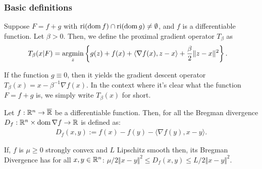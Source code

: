 \documentclass[12pt]{article}
\begin{document}
        \subsubsection{Basic definitions}
            \begin{definition}\label{def:pg-opt}
                Suppose $F = f + g$ with $\operatorname{ri}(\operatorname{dom} f) \cap \operatorname{ri}(\operatorname{dom} g) \neq \emptyset$, and $f$ is a differentiable function. 
                Let $\beta > 0$. 
                Then, we define the proximal gradient operator $T_{\beta}$ as 
                \begin{align*}
                    T_\beta (x | F) &= \mathop{\rm argmin}\limits_{z} \left\lbrace
                        g(z) + f(x) + \langle \nabla f(x), z - x\rangle + \frac{\beta}{2}\Vert z - x\Vert^2
                    \right\rbrace. 
                \end{align*}
            \end{definition}
            \begin{remark}
                If the function $g \equiv 0$, then it yields the gradient descent operator $T_\beta(x) = x - \beta^{-1}\nabla f(x)$. 
                In the context where it's clear what the function $F = f + g$ is, we simply write $T_\beta(x)$ for short. 
            \end{remark}
            \begin{definition}
                Let $f:\mathbb R^n \rightarrow \overline {\mathbb R}$ be a differentiable function. 
                Then, for all the Bregman divergence $D_f: \mathbb R^n \times \operatorname{dom}\nabla f \rightarrow \mathbb R$ is defined as: 
                \begin{align*}
                    D_f(x, y) := f(x) - f(y) - \langle \nabla f(y), x - y\rangle. 
                \end{align*}
            \end{definition}
            \begin{remark}
                If, $f$ is $\mu \ge 0$ strongly convex and $L$ Lipschitz smooth then, its Bregman Divergence has for all $x, y \in \mathbb R^n$: $\mu/2 \Vert x - y\Vert^2 \le D_f(x, y) \le L/2 \Vert x - y\Vert^2$. 
            \end{remark}
\end{document}
